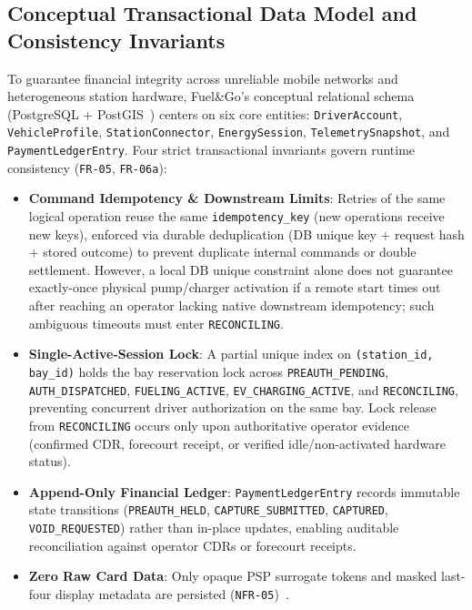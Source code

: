 

\subsection{Conceptual Transactional Data Model and Consistency Invariants}
\label{sec:data-model}

To guarantee financial integrity across unreliable mobile networks and heterogeneous station hardware, Fuel\&Go's conceptual relational schema (PostgreSQL + PostGIS~\cite{postgis2025docs}) centers on six core entities: \texttt{DriverAccount}, \texttt{VehicleProfile}, \texttt{StationConnector}, \texttt{EnergySession}, \texttt{TelemetrySnapshot}, and \texttt{Payment\-Ledger\-Entry}. Four strict transactional invariants govern runtime consistency (\texttt{FR-05}, \texttt{FR-06a}):

\begin{itemize}[leftmargin=1.4em, itemsep=2pt]
  \item \textbf{Command Idempotency \& Downstream Limits}: Retries of the same logical operation reuse the same \texttt{idempotency\_key} (new operations receive new keys), enforced via durable deduplication (DB unique key + request hash + stored outcome) to prevent duplicate internal commands or double settlement. However, a local DB unique constraint alone does not guarantee exactly-once physical pump/charger activation if a remote start times out after reaching an operator lacking native downstream idempotency; such ambiguous timeouts must enter \texttt{RECONCILING}.
  \item \textbf{Single-Active-Session Lock}: A partial unique index on \texttt{(station\_id, bay\_id)} holds the bay reservation lock across \texttt{PREAUTH\_PENDING}, \texttt{AUTH\_\-DISPATCHED}, \texttt{FUELING\_ACTIVE}, \texttt{EV\_CHARGING\_ACTIVE}, and \texttt{RECONCILING}, preventing concurrent driver authorization on the same bay. Lock release from \texttt{RECONCILING} occurs only upon authoritative operator evidence (confirmed CDR, forecourt receipt, or verified idle/non-activated hardware status).
  \item \textbf{Append-Only Financial Ledger}: \texttt{PaymentLedgerEntry} records immutable state transitions (\texttt{PREAUTH\_HELD}, \texttt{CAPTURE\_\-SUBMITTED}, \texttt{CAPTURED}, \texttt{VOID\_\-REQUESTED}) rather than in-place updates, enabling auditable reconciliation against operator CDRs or forecourt receipts.
  \item \textbf{Zero Raw Card Data}: Only opaque PSP surrogate tokens and masked last-four display metadata are persisted (\texttt{NFR-05})~\cite{pcissc2024pcidss401}.
\end{itemize}

